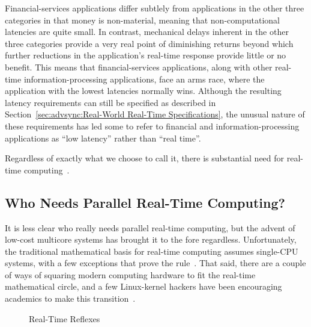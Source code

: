 Financial-services applications differ subtlely from applications in
the other three categories in that money is non-material, meaning that
non-computational latencies are quite small.
In contrast, mechanical delays inherent in the other three categories
provide a very real point of diminishing returns beyond which further
reductions in the application's real-time response provide little or
no benefit.
This means that financial-services applications, along with other
real-time information-processing applications, face an arms race,
where the application with the lowest latencies normally wins.
Although the resulting latency requirements can still be specified
as described in
Section~\ref{sec:advsync:Real-World Real-Time Specifications},
the unusual nature of these requirements has led some to refer to
financial and information-processing applications as ``low latency''
rather than ``real time''.

Regardless of exactly what we choose to call it, there is substantial
need for real-time
computing~\cite{JeremyWPeters2006NYTDec11,BillInmon2007a}.

\subsection{Who Needs Parallel Real-Time Computing?}
\label{sec:advsync:Who Needs Parallel Real-Time Computing?}

It is less clear who really needs parallel real-time computing, but
the advent of low-cost multicore systems has brought it to the fore
regardless.
Unfortunately, the traditional mathematical basis for real-time
computing assumes single-CPU systems, with a few exceptions that
prove the rule~\cite{BjoernBrandenburgPhD}.
That said, there are a couple of ways of squaring modern computing
hardware to fit the real-time mathematical circle, and a few Linux-kernel
hackers have been encouraging academics to make this
transition~\cite{ThomasGleixner2010AcademiaVsReality}.

\begin{figure}[tb]
\centering
{}
\caption{Real-Time Reflexes}
\label{fig:advsync:Real-Time Reflexes}
\end{figure}

